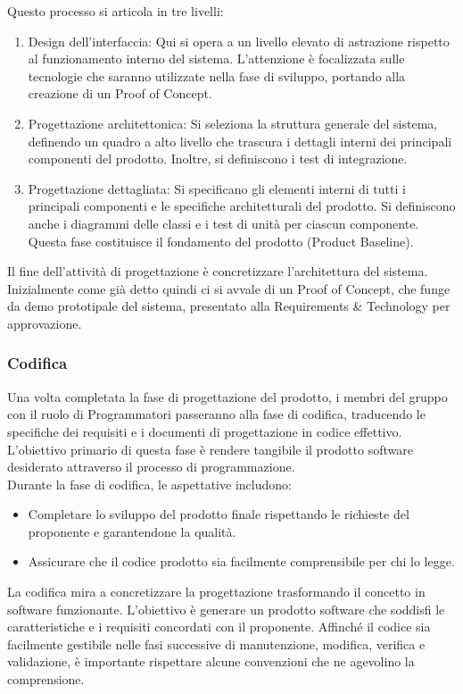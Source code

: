 \documentclass{article}
\begin{document}
Questo processo si articola in tre livelli:

\begin{enumerate}
    \item Design dell'interfaccia: Qui si opera a un livello elevato di astrazione rispetto al funzionamento interno del sistema. L'attenzione è focalizzata sulle tecnologie che saranno utilizzate nella fase di sviluppo, portando alla creazione di un Proof of Concept.
    \item Progettazione architettonica: Si seleziona la struttura generale del sistema, definendo un quadro a alto livello che trascura i dettagli interni dei principali componenti del prodotto. Inoltre, si definiscono i test di integrazione.
    \item Progettazione dettagliata: Si specificano gli elementi interni di tutti i principali componenti e le specifiche architetturali del prodotto. Si definiscono anche i diagrammi delle classi e i test di unità per ciascun componente. Questa fase costituisce il fondamento del prodotto (Product Baseline).
\end{enumerate}
Il fine dell'attività di progettazione è concretizzare l'architettura del sistema. Inizialmente come già detto quindi ci si avvale di un Proof of Concept, che funge da demo prototipale del sistema, presentato alla Requirements \& Technology per approvazione.

\subsubsection{Codifica}
Una volta completata la fase di progettazione del prodotto, i membri del gruppo con il ruolo di Programmatori passeranno alla fase di codifica, traducendo le specifiche dei requisiti e i documenti di progettazione in codice effettivo. L'obiettivo primario di questa fase è rendere tangibile il prodotto software desiderato attraverso il processo di programmazione.\\
Durante la fase di codifica, le aspettative includono:
\begin{itemize}
    \item Completare lo sviluppo del prodotto finale rispettando le richieste del proponente e garantendone la qualità.
    \item Assicurare che il codice prodotto sia facilmente comprensibile per chi lo legge.
\end{itemize}
La codifica mira a concretizzare la progettazione trasformando il concetto in software funzionante. L'obiettivo è generare un prodotto software che soddisfi le caratteristiche e i requisiti concordati con il proponente. Affinché il codice sia facilmente gestibile nelle fasi successive di manutenzione, modifica, verifica e validazione, è importante rispettare alcune convenzioni che ne agevolino la comprensione.
\end{document}
